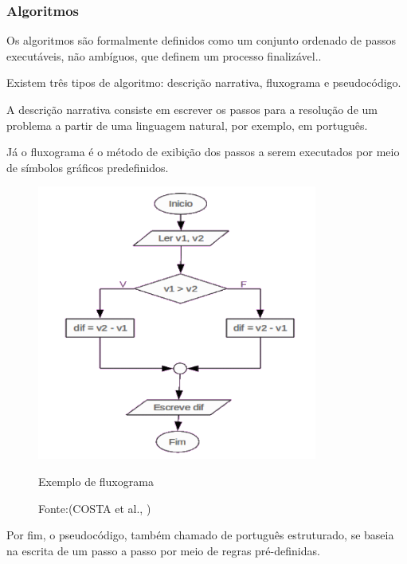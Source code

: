 \documentclass[a4paper, 12pt]{article}[abntex2]
\begin{document}
{                \subsubsection{Algoritmos}
                   Os algoritmos são formalmente definidos como um conjunto ordenado de passos executáveis, não ambíguos, que definem um processo finalizável.\cite{sousa2014introduccao}.\par
                    Existem três tipos de algoritmo: descrição narrativa, fluxograma e pseudocódigo.\par
                    A descrição narrativa consiste em escrever os passos para a resolução de um problema a partir de uma linguagem natural, por exemplo, em português.\par
                    Já o fluxograma é o método de exibição dos passos a serem executados por meio de símbolos gráficos predefinidos.\par
                    \vspace{1cm}
                    \begin{figure}[h!]
                        \centering
                        \includegraphics[width = 0.5\linewidth]{figuras/Fluxograma.png}
                        \caption{Exemplo de fluxograma}
                        \caption*{Fonte:(COSTA et al., )}
                        \label{fig: fluxograma}
                    \end{figure}
                    \vspace{1cm}
                    \par Por fim, o pseudocódigo, também chamado de português estruturado, se baseia na escrita de um passo a passo por meio de regras pré-definidas. 
}
\end{document}
